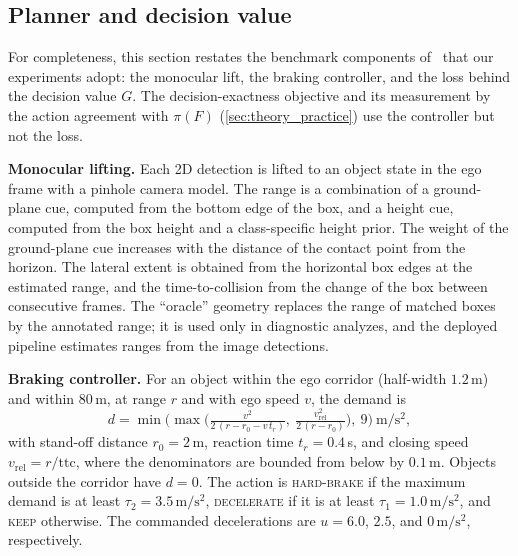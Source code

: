 \documentclass[10pt,letterpaper]{article}
\newcommand{\full}{F}
\newcommand{\policy}{\pi}
\newcommand{\dem}{d}
\newcommand{\G}{G}
\theoremstyle{remark}
\theoremstyle{plain}
\theoremstyle{definition}
\begin{document}
\subsection{Planner and decision value}
\label{sec:supp_metric}

For completeness, this section restates the benchmark components of~\cite{deep} that our experiments adopt: the monocular lift, the braking controller, and the loss behind the decision value $\G$. The decision-exactness objective and its measurement by the action agreement with $\policy(\full)$ (\cref{sec:theory_practice}) use the controller but not the loss.

\noindent\textbf{Monocular lifting.}
Each 2D detection is lifted to an object state in the ego frame with a pinhole camera model.
The range is a combination of a ground-plane cue, computed from the bottom edge of the box, and a height cue, computed from the box height and a class-specific height prior. The weight of the ground-plane cue increases with the distance of the contact point from the horizon.
The lateral extent is obtained from the horizontal box edges at the estimated range, and the time-to-collision from the change of the box between consecutive frames.
The ``oracle'' geometry replaces the range of matched boxes by the annotated range; it is used only in diagnostic analyzes, and the deployed pipeline estimates ranges from the image detections.

\noindent\textbf{Braking controller.}
For an object within the ego corridor (half-width $1.2$\,m) and within $80$\,m, at range $r$ and with ego speed $v$, the demand is
\begin{equation}
\dem = \min\!\Big(\max\Big(\tfrac{v^2}{2\,(r-r_0-v\,t_r)},\ \tfrac{v_{\mathrm{rel}}^2}{2\,(r-r_0)}\Big),\ 9\Big)\ \mathrm{m/s^2},
\label{eq:s_demand}
\end{equation}
with stand-off distance $r_0=2$\,m, reaction time $t_r=0.4$\,s, and closing speed $v_{\mathrm{rel}}=r/\mathrm{ttc}$, where the denominators are bounded from below by $0.1$\,m. Objects outside the corridor have $\dem=0$.
The action is \textsc{hard-brake} if the maximum demand is at least $\tau_2=3.5\,\mathrm{m/s^2}$, \textsc{decelerate} if it is at least $\tau_1=1.0\,\mathrm{m/s^2}$, and \textsc{keep} otherwise. The commanded decelerations are $u=6.0$, $2.5$, and $0\,\mathrm{m/s^2}$, respectively.
\end{document}
